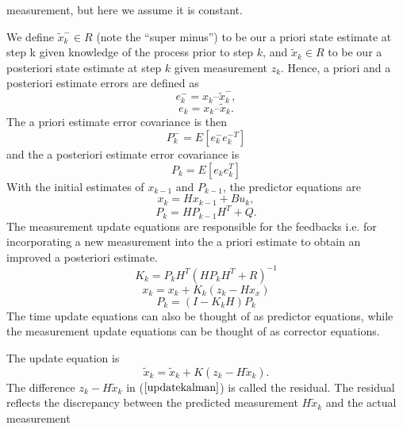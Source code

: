 \documentclass[journal]{IEEEtran}
\begin{document}
measurement, but here we assume it is constant.
\par
We define $\tilde x_k^- \in R$ (note the “super minus”) to be our a priori state estimate at step k given knowledge of the process prior to step $k$, and $\tilde x_k \in R$ to be our a posteriori state estimate at step $k$ given measurement $z_k$. Hence, a priori and a posteriori estimate errors are defined as
\begin{equation}
e_k^- = x_k – \tilde x_k^- ,
\end{equation}
\begin{equation}
e_k =  x_k – \tilde x_k.
\end{equation}
The a priori estimate error covariance is then
\begin{equation}
P_k^- = E[ e_k^- e_k^{-T} ]
\end{equation}
and the a posteriori estimate error covariance is
\begin{equation}
P_k = E[e_k e_k^T]
\end{equation}
With the initial estimates of $x_{k-1}$ and $P_{k-1}$, the predictor equations are 
\begin{equation}
x_k = Hx_{k-1} + Bu_k,
\end{equation}
\begin{equation}
P_k = HP_{k-1}H^T + Q.
\end{equation}
The measurement update equations are responsible for the feedbacks
i.e. for incorporating a new measurement into the a priori estimate
to obtain an improved a posteriori estimate.
\begin{equation}
K_k = P_kH^T(HP_kH^T + R)^{-1} \label{kalmangain}
\end{equation}
\begin{equation}
x_k = x_k + K_k(z_k - Hx_x)
\end{equation}
\begin{equation}
P_k = (I-K_kH)P_k
\end{equation}
The time update equations can also be thought of as predictor
equations, while the measurement update equations can be thought of
as corrector equations.
\par 
The update equation is
\begin{equation}
\tilde x_k = \tilde x_k + K(z_k-H\tilde x_k).
\label{updatekalman}
\end{equation}
The difference $z_k - H\tilde x_k$ in ($\ref{updatekalman}$) is called
the residual. The residual reflects the discrepancy between the
predicted measurement $H\tilde x_k$ and the actual measurement
\end{document}
